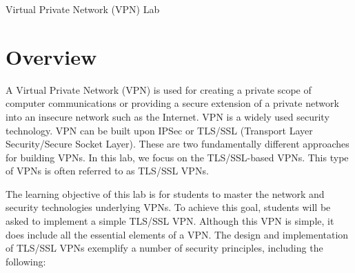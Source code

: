 
\newcommand{\commonfolder}{../../common-files}





\usepackage{longtable}
\usepackage{enumitem}
\usepackage{stackengine}
\newcommand\xrowht[2][0]{\addstackgap[.5\dimexpr#2\relax]{\vphantom{#1}}}



\newcommand{\miniVPN}{{\tt MiniVPN}\xspace}
\newcommand{\hostu}{{\tt U}\xspace}
\newcommand{\hostv}{{\tt V}\xspace}


\newcommand{\vpnFigs}{./Figs}





\begin{center}
{\LARGE Virtual Private Network (VPN) Lab}
\end{center}




\section{Overview}

A Virtual Private Network (VPN) is used for creating a private scope 
of computer communications or providing a secure extension of a private 
network into an insecure network such as the Internet. VPN is a widely
used security technology. VPN can be built upon IPSec or 
TLS/SSL (Transport Layer Security/Secure Socket Layer). 
These are two fundamentally different 
approaches for building VPNs. In this lab, we focus 
on the TLS/SSL-based VPNs. This type of VPNs is often referred to 
as TLS/SSL VPNs.

The learning objective of this lab is for students to master the 
network and security technologies underlying VPNs. To achieve this goal,  
students will be asked to implement a simple TLS/SSL VPN. 
Although this VPN is simple, it does include all the essential
elements of a VPN. The design and implementation of TLS/SSL VPNs exemplify
a number of security principles, including the following:

